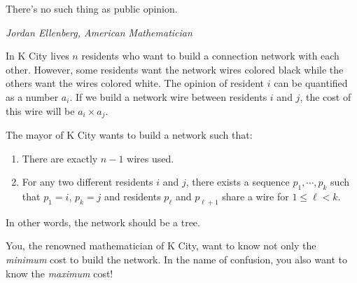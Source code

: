 \epigraph{There's no such thing as public opinion.}{\textit{Jordan Ellenberg, American Mathematician}}

In K City lives $n$ residents who want to build a connection network with 
each other. However, some residents want the network wires colored black while 
the others want the wires colored white. The opinion of resident $i$ can be 
quantified as a number $a_i$. If we build a network wire between residents 
$i$ and $j$, the cost of this wire will be $a_i \times a_j$.

The mayor of K City wants to build a network such that:

\begin{enumerate}
\tightlist
\item There are exactly $n - 1$ wires used.
\item For any two different residents $i$ and $j$, there exists a sequence 
$p_1, \cdots, p_k$ such that $p_1=i$, $p_k=j$ and residents $p_\ell$ and 
$p_{\ell+1}$ share a wire for $1\le \ell < k$.
\end{enumerate}

In other words, the network should be a tree.

You, the renowned mathematician of K City, want to know not only the 
\emph{minimum} 
cost to build the network. In the name of confusion, you also want to know the
\emph{maximum} cost!
